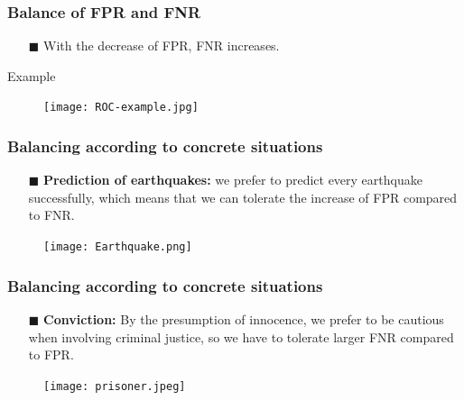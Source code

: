 \documentclass{beamer}
\begin{document}
\begin{frame}
    \frametitle{Balance of FPR and FNR}
    
    \begin{itemize}
        \item[$\blacksquare$] With the decrease of FPR, FNR increases.
    \end{itemize}
    
    \begin{exampleblock}{Example}
        \begin{figure}[h]
            \centering
            \texttt{[image: ROC-example.jpg]}    
        \end{figure}    
    \end{exampleblock}
\end{frame}

\begin{frame}
    \frametitle{Balancing according to concrete situations}
    
    \begin{itemize}
        \item[$\blacksquare$] \textbf{Prediction of earthquakes:} we prefer to predict every earthquake successfully, which means that we can tolerate the increase of FPR compared to FNR.
    \end{itemize}
    \begin{figure}[h]
        \centering
        \texttt{[image: Earthquake.png]}   
    \end{figure} 
\end{frame}

\begin{frame}
    \frametitle{Balancing according to concrete situations}
    
    \begin{itemize}
        \item[$\blacksquare$] \textbf{Conviction:} By the presumption of innocence, we prefer to be cautious when involving criminal justice, so we have to tolerate larger FNR compared to FPR.
    \end{itemize}
    \begin{figure}[h]
        \centering
        \texttt{[image: prisoner.jpeg]}
    \end{figure} 
\end{frame}

\end{document}
